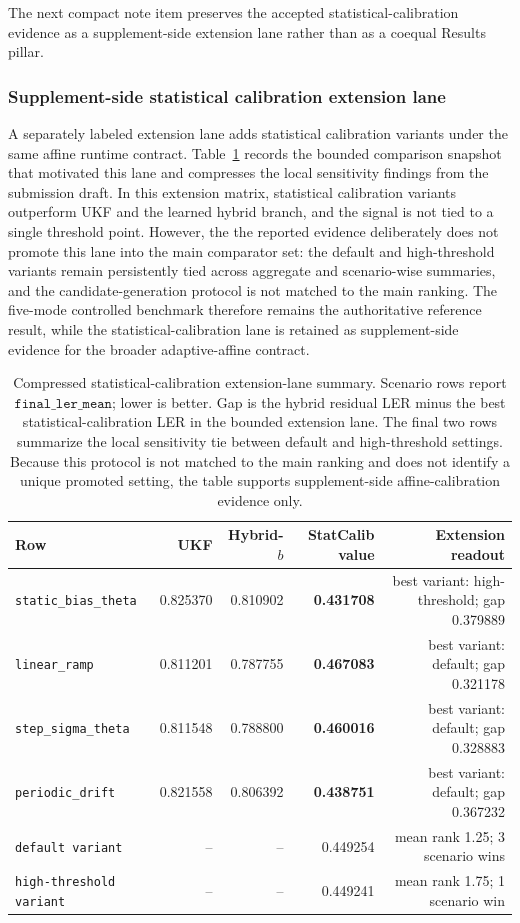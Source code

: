 \documentclass[11pt]{article}
\begin{document}
The next compact note item preserves the accepted statistical-calibration
evidence as a supplement-side extension lane rather than as a coequal Results
pillar.

\subsubsection{Supplement-side statistical calibration extension lane}

A separately labeled extension lane adds statistical calibration variants under
the same affine runtime contract.  Table~\ref{tab:statcalib-extension} records
the bounded comparison snapshot that motivated this lane and compresses the
local sensitivity findings from the submission draft.  In this extension
matrix, statistical calibration variants outperform UKF and the learned hybrid
branch, and the signal is not tied to a single threshold point.  However, the
the reported evidence deliberately does not promote this lane into the main
comparator set: the default and high-threshold variants remain persistently
tied across aggregate and scenario-wise summaries, and the candidate-generation
protocol is not matched to the main ranking.  The five-mode controlled
benchmark therefore remains the authoritative reference result, while the
statistical-calibration lane is retained as supplement-side evidence for the
broader adaptive-affine contract.

\begin{table}[ht]
\centering
\scriptsize
\setlength{\tabcolsep}{2.5pt}
\begin{tabular}{lrrrr}
\toprule
Row & UKF & Hybrid-\(b\) & StatCalib value & Extension readout \\
\midrule
\texttt{static\_bias\_theta} & 0.825370 & 0.810902 & \textbf{0.431708} & best variant: high-threshold; gap 0.379889 \\
\texttt{linear\_ramp} & 0.811201 & 0.787755 & \textbf{0.467083} & best variant: default; gap 0.321178 \\
\texttt{step\_sigma\_theta} & 0.811548 & 0.788800 & \textbf{0.460016} & best variant: default; gap 0.328883 \\
\texttt{periodic\_drift} & 0.821558 & 0.806392 & \textbf{0.438751} & best variant: default; gap 0.367232 \\
\texttt{default variant} & -- & -- & 0.449254 & mean rank 1.25; 3 scenario wins \\
\texttt{high-threshold variant} & -- & -- & 0.449241 & mean rank 1.75; 1 scenario win \\
\bottomrule
\end{tabular}
\caption{Compressed statistical-calibration extension-lane summary.  Scenario
rows report \(\texttt{final\_ler\_mean}\); lower is better.  Gap is the
hybrid residual LER minus the best statistical-calibration LER in the bounded
extension lane.  The final two rows summarize the local sensitivity tie between
default and high-threshold settings.  Because this protocol is not matched to
the main ranking and does not identify a unique promoted setting, the table
supports supplement-side affine-calibration evidence only.}
\label{tab:statcalib-extension}
\end{table}
\end{document}
